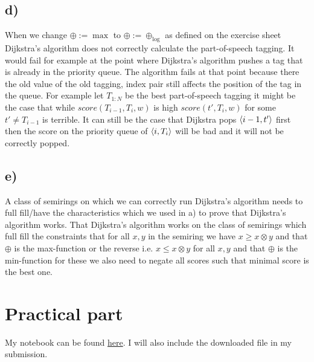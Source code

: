 \documentclass[a4paper,12pt]{ETHexercise}
\begin{document}
\subsection*{d)}
When we change $\oplus := \max$ to $\oplus := \oplus_{\log}$ as defined on the exercise sheet Dijkstra's algorithm does not correctly calculate the part-of-speech tagging.
It would fail for example at the point where Dijkstra's algorithm pushes a tag that is already in the priority queue. The algorithm fails at that point because there the old value of the old tagging, index pair still affects the position of the tag in the queue. For example let $T_{1:N}$ be the best part-of-speech tagging it might be the case that while $score(T_{i-1}, T_{i}, w)$ is high $score(t', T_{i}, w)$ for some $t' \neq T_{i-1}$ is terrible. It can still be the case that Dijkstra pops $\left\langle i-1, t'\right\rangle$ first then the score on the priority queue of $\left\langle i, T_{i}\right\rangle$ will be bad and it will not be correctly popped.

\subsection*{e)}
A class of semirings on which we can correctly run Dijkstra's algorithm needs to full fill/have the characteristics which we used in a) to prove that Dijkstra's algorithm works. That Dijkstra's algorithm works on the class of semirings which full fill the constraints that for all $x,y$ in the semiring we have $x \geq x \otimes y$ and that $\oplus$ is the max-function or the reverse i.e. $x \leq x \otimes y$ for all $x,y$ and that $\oplus$ is the min-function for these we also need to negate all scores such that minimal score is the best one.

\section*{Practical part}
My notebook can be found \href{https://colab.research.google.com/drive/12TscdKKPl-O5Xpp4rBXUnRU3w9f-TZPL?usp=sharing}{here}. I will also include the downloaded file in my submission.
\end{document}
